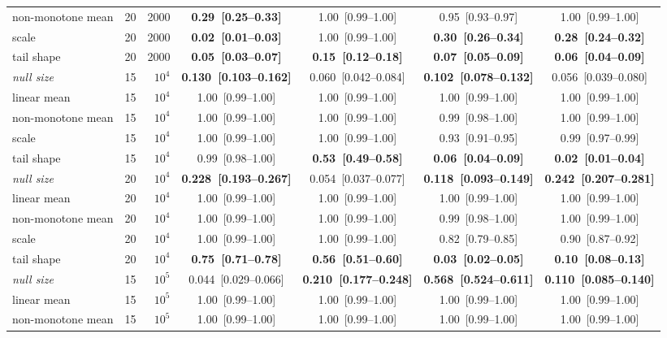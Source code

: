 \begin{table}[p]
{\begin{tabular}{llrcccc}
non-monotone mean & 20 & 2000 & \textbf{0.29~[0.25--0.33]} & 1.00~[0.99--1.00] & 0.95~[0.93--0.97] & 1.00~[0.99--1.00] \\
scale & 20 & 2000 & \textbf{0.02~[0.01--0.03]} & 1.00~[0.99--1.00] & \textbf{0.30~[0.26--0.34]} & \textbf{0.28~[0.24--0.32]} \\
tail shape & 20 & 2000 & \textbf{0.05~[0.03--0.07]} & \textbf{0.15~[0.12--0.18]} & \textbf{0.07~[0.05--0.09]} & \textbf{0.06~[0.04--0.09]} \\
\midrule
\emph{null size} & 15 & $10^4$ & \textbf{0.130~[0.103--0.162]} & 0.060~[0.042--0.084] & \textbf{0.102~[0.078--0.132]} & 0.056~[0.039--0.080] \\
linear mean & 15 & $10^4$ & 1.00~[0.99--1.00] & 1.00~[0.99--1.00] & 1.00~[0.99--1.00] & 1.00~[0.99--1.00] \\
non-monotone mean & 15 & $10^4$ & 1.00~[0.99--1.00] & 1.00~[0.99--1.00] & 0.99~[0.98--1.00] & 1.00~[0.99--1.00] \\
scale & 15 & $10^4$ & 1.00~[0.99--1.00] & 1.00~[0.99--1.00] & 0.93~[0.91--0.95] & 0.99~[0.97--0.99] \\
tail shape & 15 & $10^4$ & 0.99~[0.98--1.00] & \textbf{0.53~[0.49--0.58]} & \textbf{0.06~[0.04--0.09]} & \textbf{0.02~[0.01--0.04]} \\
\midrule
\emph{null size} & 20 & $10^4$ & \textbf{0.228~[0.193--0.267]} & 0.054~[0.037--0.077] & \textbf{0.118~[0.093--0.149]} & \textbf{0.242~[0.207--0.281]} \\
linear mean & 20 & $10^4$ & 1.00~[0.99--1.00] & 1.00~[0.99--1.00] & 1.00~[0.99--1.00] & 1.00~[0.99--1.00] \\
non-monotone mean & 20 & $10^4$ & 1.00~[0.99--1.00] & 1.00~[0.99--1.00] & 0.99~[0.98--1.00] & 1.00~[0.99--1.00] \\
scale & 20 & $10^4$ & 1.00~[0.99--1.00] & 1.00~[0.99--1.00] & 0.82~[0.79--0.85] & 0.90~[0.87--0.92] \\
tail shape & 20 & $10^4$ & \textbf{0.75~[0.71--0.78]} & \textbf{0.56~[0.51--0.60]} & \textbf{0.03~[0.02--0.05]} & \textbf{0.10~[0.08--0.13]} \\
\midrule
\emph{null size} & 15 & $10^5$ & 0.044~[0.029--0.066] & \textbf{0.210~[0.177--0.248]} & \textbf{0.568~[0.524--0.611]} & \textbf{0.110~[0.085--0.140]} \\
linear mean & 15 & $10^5$ & 1.00~[0.99--1.00] & 1.00~[0.99--1.00] & 1.00~[0.99--1.00] & 1.00~[0.99--1.00] \\
non-monotone mean & 15 & $10^5$ & 1.00~[0.99--1.00] & 1.00~[0.99--1.00] & 1.00~[0.99--1.00] & 1.00~[0.99--1.00] \\

\end{tabular}}
\end{table}
